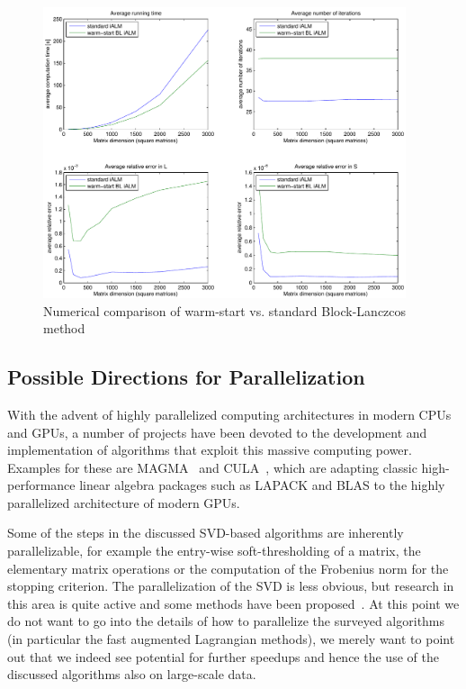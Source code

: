 \documentclass{../../common/projectreport}
\begin{document}
\begin{figure}[htbp]
\centering
\includegraphics[width=0.95\textwidth]{../figures/BLWS_comparison}
\caption{Numerical comparison of warm-start vs. standard Block-Lanczcos method}
\label{Algorithms:Discussion:SVD:BLWScomptarison:figure}
\end{figure}







\subsection{Possible Directions for Parallelization}
\label{Algorithms:Discussion:Parallel:Subsec}

With the advent of highly parallelized computing architectures in modern CPUs and GPUs, a number of projects have been devoted to the development and implementation of algorithms that exploit this massive computing power. Examples for these are MAGMA~\cite{Smith:2010tg} and CULA~\cite{Humphrey:2010kl}, which are adapting classic high-performance linear algebra packages such as LAPACK and BLAS to the highly parallelized architecture of modern GPUs. 

Some of the steps in the discussed SVD-based algorithms are inherently parallelizable, for example the entry-wise soft-thresholding of a matrix, the elementary matrix operations or the computation of the Frobenius norm for the stopping criterion. The parallelization of the SVD is less obvious, but research in this area is quite active and some methods have been proposed~\cite{Berry:2005uq}. At this point we do not want to go into the details of how to parallelize the surveyed algorithms (in particular the fast augmented Lagrangian methods), we merely want to point out that we indeed see potential for further speedups and hence the use of the discussed algorithms also on large-scale data.
%
%
\end{document}
